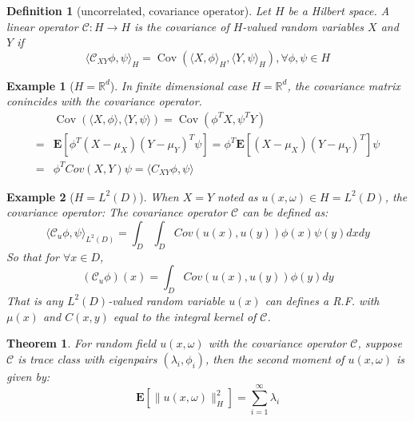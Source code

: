 \documentclass{article}
\newtheorem{theorem}{Theorem}
\newtheorem{definition}{Definition}
\newtheorem{example}{Example}
\begin{document}
\begin{definition}[uncorrelated, covariance operator]
  Let $H$ be a Hilbert space. A linear operator $\mathcal{C}:H\rightarrow H$ is the covariance of $H$-valued random variables $X$ and $Y$ if 
  \begin{equation}
      \langle\mathcal{C}_{XY}\phi, \psi\rangle_H = \operatorname{Cov}\left(\langle X, \phi\rangle_H, \langle Y, \psi\rangle_H\right), \forall \phi, \psi \in H
  \end{equation}
\end{definition}

\begin{example}[$H = \mathbb{R}^d$]
  In finite dimensional case $H = \mathbb{R}^d$, the covariance matrix conincides with the covariance operator. 
  \begin{equation}
      \begin{aligned}
          &\operatorname{Cov}\left(\langle X, \phi\rangle, \langle Y, \psi\rangle\right) 
          = \operatorname{Cov}\left(\phi^T X, \psi^T Y\right)\\
          =&\mathbf{E}\left[\phi^T(X-\mu_X)(Y-\mu_Y)^T\psi\right] 
          = \phi^T\mathbf{E}\left[(X-\mu_X)(Y-\mu_Y)^T\right]\psi\\
          =&\phi^T Cov(X, Y)\psi = \langle C_{XY}\phi, \psi\rangle
      \end{aligned}
  \end{equation}
\end{example}

\begin{example}[$H = L^2(D)$]
  When $X = Y$ noted as $u(x, \omega)\in H=L^2(D)$, the covariance operator:
  The covariance operator $\mathcal{C}$ can be defined as:
  \begin{equation}
  \langle\mathcal{C}_u\phi, \psi\rangle_{L^2(D)} = \int_D\int_D Cov(u(x), u(y)) \phi(x) \psi(y) dx dy
  \end{equation}
  So that for $\forall x\in D$,
  \begin{equation}
  (\mathcal{C}_u\phi)(x) = \int_D Cov(u(x), u(y)) \phi(y) dy
  \end{equation}
  That is any $L^2(D)$-valued random variable $u(x)$ can defines a R.F. with $\mu(x)$ and $C(x, y)$ equal to the integral kernel of $\mathcal{C}$.
\end{example}

\begin{theorem}\label{thmtraceclass}
  For random field $u(x,\omega)$ with the covariance operator $\mathcal{C}$, suppose $\mathcal{C}$ is trace class with eigenpairs $(\lambda_i, \phi_i)$, 
  then the second moment of $u(x, \omega)$ is given by:
  \begin{equation}
    \mathbf{E}[\|u(x, \omega)\|^2_H] = \sum_{i=1}^{\infty} \lambda_i
  \end{equation}
\end{theorem}
\end{document}
